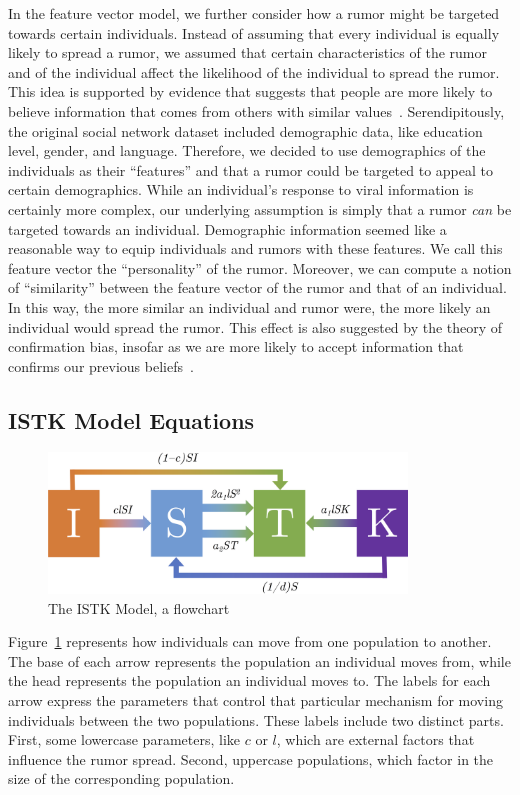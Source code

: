 In the feature vector model, we further consider how a rumor might be targeted towards certain individuals.
Instead of assuming that every individual is equally likely to spread a rumor, we assumed that certain characteristics of the rumor and of the individual affect the likelihood of the individual to spread the rumor.
This idea is supported by evidence that suggests that people are more likely to believe information that comes from others with similar values~\cite{gillespie-2004}.
Serendipitously, the original social network dataset included demographic data, like education level, gender, and language.
Therefore, we decided to use demographics of the individuals as their ``features'' and that a rumor could be targeted to appeal to certain demographics.
While an individual's response to viral information is certainly more complex, our underlying assumption is simply that a rumor \textit{can} be targeted towards an individual.
Demographic information seemed like a reasonable way to equip individuals and rumors with these features.
We call this feature vector the ``personality'' of the rumor.
Moreover, we can compute a notion of ``similarity'' between the feature vector of the rumor and that of an individual.
In this way, the more similar an individual and rumor were, the more likely an individual would spread the rumor.
This effect is also suggested by the theory of confirmation bias, insofar as we are more likely to accept information that confirms our previous beliefs~\cite{wason-1960}.

\subsection{ISTK Model Equations}
\label{subsec:istkeqns}

\begin{figure}[H]
\captionsetup{width=0.6\textwidth}
\centering
    \includegraphics[width=0.85\textwidth]{figures/flow-chart}
  \caption{The ISTK Model, a flowchart}
\label{fig:flow-chart}
\end{figure}

\noindent Figure~\ref{fig:flow-chart} represents how individuals can move from one population to another.
The base of each arrow represents the population an individual moves from, while the head represents the population an individual moves to.
The labels for each arrow express the parameters that control that particular mechanism for moving individuals between the two populations. These labels include two distinct parts. First, some lowercase parameters, like $ c $ or $ l $, which are external factors that influence the rumor spread. Second, uppercase populations, which factor in the size of the corresponding population.

